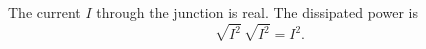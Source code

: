 \documentclass{article}
\begin{document}
The current $I$ through the junction is real. The dissipated power is
\begin{equation}
\sqrt{I^2}\,\sqrt{I^2} = I^2 .
\label{eq:pow}
\end{equation}
\end{document}
